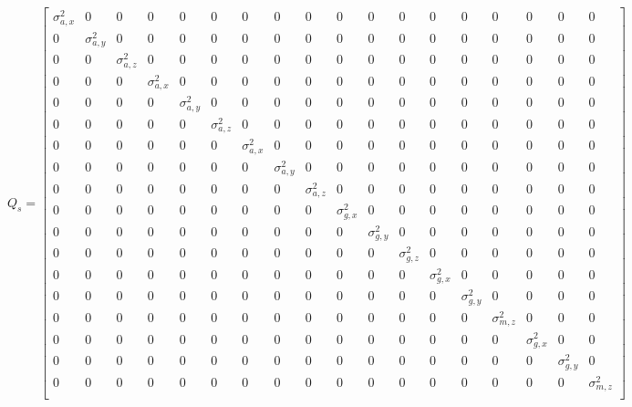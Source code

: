 \documentclass[12pt]{article}
\begin{document}
\begin{equation}
    Q_s  = \begin{bmatrix}
        \sigma_{a, x}^2 & 0 & 0 & 0 & 0 & 0 & 0 & 0 & 0 & 0 & 0 & 0 & 0 & 0 & 0 & 0 & 0 & 0 \\
        0 & \sigma_{a, y}^2 & 0 & 0 & 0 & 0 & 0 & 0 & 0 & 0 & 0 & 0 & 0 & 0 & 0 & 0 & 0 & 0 \\
        0 & 0 & \sigma_{a, z}^2 & 0 & 0 & 0 & 0 & 0 & 0 & 0 & 0 & 0 & 0 & 0 & 0 & 0 & 0 & 0 \\
        0 & 0 & 0 & \sigma_{a, x}^2 & 0 & 0 & 0 & 0 & 0 & 0 & 0 & 0 & 0 & 0 & 0 & 0 & 0 & 0 \\
        0 & 0 & 0 & 0 & \sigma_{a, y}^2 & 0 & 0 & 0 & 0 & 0 & 0 & 0 & 0 & 0 & 0 & 0 & 0 & 0 \\
        0 & 0 & 0 & 0 & 0 & \sigma_{a, z}^2 & 0 & 0 & 0 & 0 & 0 & 0 & 0 & 0 & 0 & 0 & 0 & 0 \\
        0 & 0 & 0 & 0 & 0 & 0 & \sigma_{a, x}^2 & 0 & 0 & 0 & 0 & 0 & 0 & 0 & 0 & 0 & 0 & 0 \\
        0 & 0 & 0 & 0 & 0 & 0 & 0 & \sigma_{a, y}^2 & 0 & 0 & 0 & 0 & 0 & 0 & 0 & 0 & 0 & 0  \\
        0 & 0 & 0 & 0 & 0 & 0 & 0 & 0 & \sigma_{a, z}^2 & 0 & 0 & 0 & 0 & 0 & 0 & 0 & 0 & 0  \\
        0 & 0 & 0 & 0 & 0 & 0 & 0 & 0 & 0 & \sigma_{g, x}^2 & 0 & 0 & 0 & 0 & 0 & 0 & 0 & 0  \\
        0 & 0 & 0 & 0 & 0 & 0 & 0 & 0 & 0 & 0 & \sigma_{g, y}^2 & 0 & 0 & 0 & 0 & 0 & 0 & 0  \\
        0 & 0 & 0 & 0 & 0 & 0 & 0 & 0 & 0 & 0 & 0 & \sigma_{g, z}^2 & 0 & 0 & 0 & 0 & 0 & 0  \\
        0 & 0 & 0 & 0 & 0 & 0 & 0 & 0 & 0 & 0 & 0 & 0 & \sigma_{g, x}^2 & 0 & 0 & 0 & 0 & 0  \\
        0 & 0 & 0 & 0 & 0 & 0 & 0 & 0 & 0 & 0 & 0 & 0 & 0 & \sigma_{g, y}^2 & 0 & 0 & 0 & 0  \\
        0 & 0 & 0 & 0 & 0 & 0 & 0 & 0 & 0 & 0 & 0 & 0 & 0 & 0 & \sigma_{m, z}^2 & 0 & 0 & 0  \\
        0 & 0 & 0 & 0 & 0 & 0 & 0 & 0 & 0 & 0 & 0 & 0 & 0 & 0 & 0 & \sigma_{g, x}^2 & 0 & 0 \\
        0 & 0 & 0 & 0 & 0 & 0 & 0 & 0 & 0 & 0 & 0 & 0 & 0 & 0 & 0 & 0 & \sigma_{g, y}^2 & 0 \\
        0 & 0 & 0 & 0 & 0 & 0 & 0 & 0 & 0 & 0 & 0 & 0 & 0 & 0 & 0 & 0 & 0 & \sigma_{m,z}^2 \\
\end{bmatrix}
\end{equation}
\end{document}
